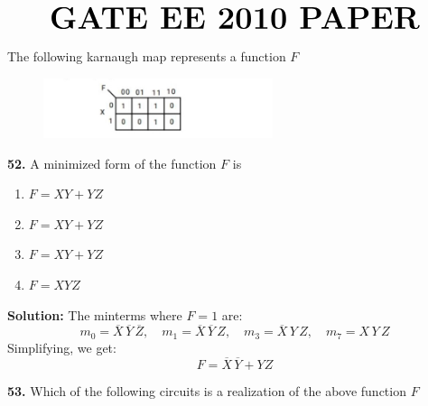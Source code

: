 \documentclass{article}
\date{\today}
\begin{document}
\thispagestyle{fancy}
\fancyhf{}
\renewcommand{\headrulewidth}{0.4pt}
\fancyfoot[c]{\thepage}
\vspace{1cm}
\begin{center}
$$\textbf{\Huge GATE EE 2010 PAPER}$$
\end{center}
The following karnaugh map represents a function \(F\)
\begin{figure}[h!]
    \centering
    \includegraphics[width=0.6\textwidth]{Kmap.jpg}
\end{figure}
\textbf{52.} A minimized form of the function \( F \) is
\begin{enumerate}[label=(\Alph*)]
    \item \( F = XY + YZ \)
    \item \( F = X Y + Y Z \)
    \item \( F = X Y + Y Z \)
    \item \( F = X Y Z \)
\end{enumerate}
\textbf{Solution:}
The minterms where $F=1$ are:
$$
m_0 = \overline{X} \, \overline{Y} \, \overline{Z}, \quad
m_1 = \overline{X} \, \overline{Y} \, Z, \quad
m_3 = \overline{X} \, Y \, Z, \quad
m_7 = X \, Y \, Z
$$
Simplifying, we get:
$$
F = \overline{X} \, \overline{Y} + YZ
$$

\textbf{53.} Which of the following circuits is a realization of the above function \(F\)
\end{document}

